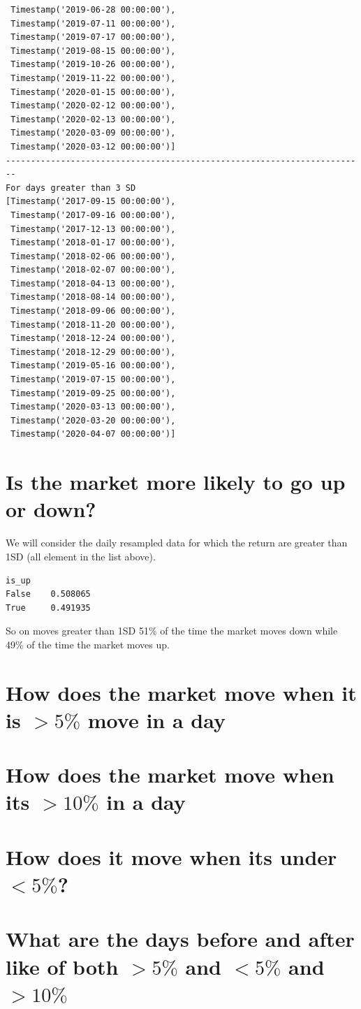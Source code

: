 \begin{verbatim}
 Timestamp('2019-06-28 00:00:00'),
 Timestamp('2019-07-11 00:00:00'),
 Timestamp('2019-07-17 00:00:00'),
 Timestamp('2019-08-15 00:00:00'),
 Timestamp('2019-10-26 00:00:00'),
 Timestamp('2019-11-22 00:00:00'),
 Timestamp('2020-01-15 00:00:00'),
 Timestamp('2020-02-12 00:00:00'),
 Timestamp('2020-02-13 00:00:00'),
 Timestamp('2020-03-09 00:00:00'),
 Timestamp('2020-03-12 00:00:00')]
------------------------------------------------------------------------
For days greater than 3 SD
[Timestamp('2017-09-15 00:00:00'),
 Timestamp('2017-09-16 00:00:00'),
 Timestamp('2017-12-13 00:00:00'),
 Timestamp('2018-01-17 00:00:00'),
 Timestamp('2018-02-06 00:00:00'),
 Timestamp('2018-02-07 00:00:00'),
 Timestamp('2018-04-13 00:00:00'),
 Timestamp('2018-08-14 00:00:00'),
 Timestamp('2018-09-06 00:00:00'),
 Timestamp('2018-11-20 00:00:00'),
 Timestamp('2018-12-24 00:00:00'),
 Timestamp('2018-12-29 00:00:00'),
 Timestamp('2019-05-16 00:00:00'),
 Timestamp('2019-07-15 00:00:00'),
 Timestamp('2019-09-25 00:00:00'),
 Timestamp('2020-03-13 00:00:00'),
 Timestamp('2020-03-20 00:00:00'),
 Timestamp('2020-04-07 00:00:00')]
\end{verbatim}

\section{ Is the market more likely to go up or down?}
We will consider the daily resampled data for which the return are greater than 1SD (all element in the list above).
\begin{verbatim}
is_up
False    0.508065
True     0.491935
\end{verbatim}
So on moves greater than 1SD 51\% of the time the market moves down while 49\% of the time the market moves up.
\section{ How does the market move when it is $>5  \%  $ move in a day}
\section{ How does the market move when its $>10 \% $ in a day}
\section{ How does it move when its under $<5 \% $?}
\section{ What are the days before and after like of both $>5 \% $ and $<5 \% $ and $> 10 \% $}
